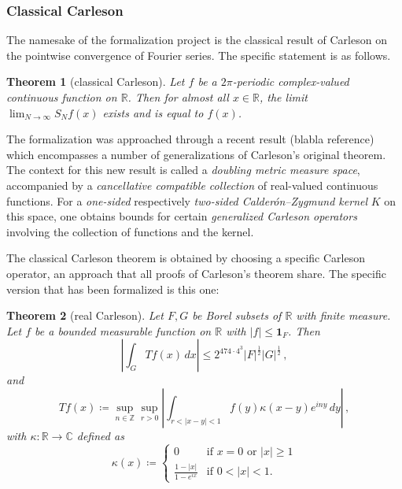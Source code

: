 \documentclass[12pt]{amsart}
\newcommand*{\real}{\mathbb{R}} %
\theoremstyle{definition}
\theoremstyle{plain}
\newtheorem{theorem}{Theorem}[subsection]
\def\C{\mathbb{C}}
\begin{document}
\subsubsection{Classical Carleson}\label{subsubsec:classical-result}

The namesake of the formalization project is the classical result of Carleson on the pointwise convergence of Fourier series.
The specific statement is as follows.

\begin{theorem}[classical Carleson]
    \label{classical-carleson}
    Let $f$ be a $2\pi$-periodic complex-valued continuous function on $\real$.
    Then for almost all $x \in \real$, the limit
    $\lim_{N\to\infty} S_N f(x)$ exists and is equal to $f(x)$.
\end{theorem}

The formalization was approached through a recent result (blabla reference) which encompasses a number of generalizations of Carleson's original theorem.
The context for this new result is called a \emph{doubling metric measure space}, accompanied by a \emph{cancellative compatible collection} of real-valued continuous functions.
For a \emph{one-sided} respectively \emph{two-sided Calder\'on--Zygmund kernel} $K$ on this space, one obtains bounds for certain \emph{generalized Carleson operators} involving the collection of functions and the kernel.

The classical Carleson theorem is obtained by choosing a specific Carleson operator, an approach that all proofs of Carleson's theorem share.
The specific version that has been formalized is this one:

\begin{theorem}[real Carleson]\label{real-Carleson}
    Let $F,G$ be Borel subsets of $\real$ with finite measure. Let $f$ be a bounded measurable function on $\real$ with $|f|\le \mathbf{1}_F$. Then
\begin{equation}
    \left|\int _G Tf(x) \, dx\right| \le 2^{474 \cdot 4^3} |F|^{\frac 12} |G|^{\frac 12} \, ,
\end{equation}
and
\begin{equation}
    \label{define-T-carleson}
    T f(x)\coloneq\sup_{n\in \mathbb{Z}}
    \sup_{r>0}\left|\int_{r<|x-y|<1} f(y)\kappa(x-y) e^{iny}\, dy\right| \, ,
\end{equation}
with $\kappa\colon \real\to\C$ defined as
\begin{equation}
    \kappa(x)\coloneq\begin{cases}
        0 & \text{if $x = 0$ or $|x| \ge 1$} \\
        \frac { 1-|x|}{1-e^{ix}} & \text{if $0 < |x| < 1$}.
    \end{cases}
\end{equation}
\end{theorem}
\end{document}
